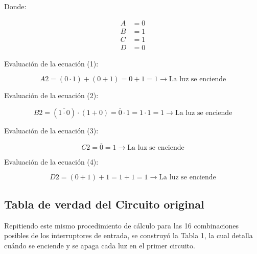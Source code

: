 \documentclass[12pt,letterpaper]{article}
\newcommand{\boolnot}[1]{\ensuremath{\overline{#1}}}
\begin{document}
    Donde:

    \begin{align*}
        A &= 0 \\
        B &= 1 \\
        C &= 1 \\
        D &= 0
    \end{align*}

    Evaluación de la ecuación (1):

    \begin{equation*}
        A2 = (0 \cdot 1) + (0 + 1) = 0 + 1 = 1 \longrightarrow \text{La luz se enciende}
    \end{equation*}

    Evaluación de la ecuación (2):

    \begin{equation*}
        B2 = (\boolnot{1 \cdot 0}) \cdot (1 + 0) = \boolnot{0} \cdot 1 = 1 \cdot 1 = 1 \longrightarrow \text{La luz se enciende}
    \end{equation*}

    Evaluación de la ecuación (3):

    \begin{equation*}
        C2 = \boolnot{0} = 1 \longrightarrow \text{La luz se enciende}
    \end{equation*}

    Evaluación de la ecuación (4):

    \begin{equation*}
        D2 = (0 + 1) + 1 = 1 + 1 = 1 \longrightarrow \text{La luz se enciende}
    \end{equation*}

    \subsection{Tabla de verdad del Circuito original}

    Repitiendo este mismo procedimiento de cálculo para las 16 combinaciones posibles de los interruptores de entrada, se construyó la Tabla 1, la cual detalla cuándo se enciende y se apaga cada luz en el primer circuito.
\end{document}
